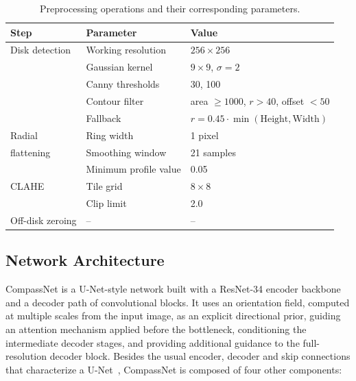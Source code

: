 \documentclass[sigconf]{acmart}
\begin{document}
\begin{table}[H]
    \centering
    \caption{Preprocessing operations and their corresponding parameters.}
    \label{tab:preprocessing}
    \footnotesize
    \renewcommand{\arraystretch}{1.12}
    \setlength{\tabcolsep}{4pt}
    \begin{tabular}{@{}lll@{}}
        \toprule
        \textbf{Step} & \textbf{Parameter} & \textbf{Value} \\
        \midrule
        Disk detection & Working resolution & $256 \times 256$ \\
                       & Gaussian kernel    & $9 \times 9$, $\sigma=2$ \\
                       & Canny thresholds   & 30, 100 \\
                       & Contour filter     & area $\geq 1000$, $r > 40$, offset $< 50$ \\
                       & Fallback           & $r = 0.45 \cdot \min(\text{Height},\text{Width})$ \\
        \midrule
        Radial     & Ring width            & 1 pixel \\
        flattening & Smoothing window      & 21 samples \\
                   & Minimum profile value & 0.05 \\
        \midrule
        CLAHE & Tile grid     & $8 \times 8$ \\
              & Clip limit    & 2.0 \\
        \midrule
        Off-disk zeroing & -- & -- \\
        \bottomrule
    \end{tabular}
\end{table}

\subsection{Network Architecture}\label{sec:architecture}
CompassNet is a U-Net-style network built with a ResNet-34 \cite{he2016deep} encoder backbone and a decoder path of convolutional blocks. It uses an orientation field, computed at multiple scales from the input image, as an explicit directional prior, guiding an attention mechanism applied before the bottleneck, conditioning the intermediate decoder stages, and providing additional guidance to the full-resolution decoder block. Besides the usual encoder, decoder and skip connections that characterize a U-Net~\cite{ronneberger2015unetconvolutionalnetworksbiomedical, solomon2025edgeattnet}, CompassNet is composed of four other components:
\end{document}

